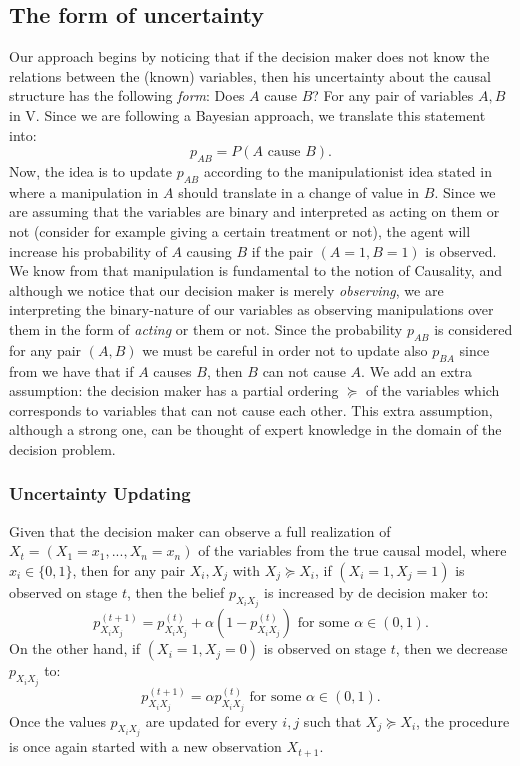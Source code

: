 \documentclass[letterpaper]{article}
\begin{document}
\subsection{The form of uncertainty}
Our approach begins by noticing that if the decision maker does not know the relations between the (known) variables, then his uncertainty about the causal structure has the following \textit{form}: Does $A$ cause $B$? For any pair of variables $A,B$ in V. Since we are following a Bayesian approach, we translate this statement into:
\[p_{AB}=P(A \textrm{ cause } B). \]
Now, the idea is to update $p_{AB}$ according to the manipulationist idea stated in \cite{woodward2005making} where a manipulation in $A$ should translate in a change of value in $B$. Since we are assuming that the variables are binary and interpreted as acting on them or not (consider for example giving a certain treatment or not), the agent will increase his probability of $A$ causing $B$ if the pair $(A=1,B=1)$ is observed. We know from \cite{holland1985statistics} that manipulation is fundamental to the notion of Causality, and although we notice that our decision maker is merely \textit{observing}, we are interpreting the binary-nature of our variables as observing manipulations over them in the form of \textit{acting} or them or not. Since the probability $p_{AB}$ is considered for any pair $(A,B)$ we must be careful in order not to update also $p_{BA}$ since from \cite{spirtes2000causation} we have that if $A$ causes $B$, then $B$ can not cause $A$. We add an extra assumption: the decision maker has a partial ordering $\succeq$ of the variables which corresponds to variables that can not cause each other. This extra assumption, although a strong one, can be thought of expert knowledge in the domain of the decision problem. 

\subsubsection{Uncertainty Updating}
Given that the decision maker can observe a full realization of $X_t=(X_1=x_1,...,X_n=x_n)$ of the variables from the true causal model, where $x_i \in \{0,1 \}$, then for any pair $X_i,X_j$ with $X_j \succeq X_i$, if $(X_i=1, X_j=1)$ is observed on stage $t$, then the belief $p_{X_i X_j}$ is increased by de decision maker to:
\[  p_{X_i X_j}^{(t+1)} = p_{X_i X_j}^{(t)}+\alpha (1-p_{X_i X_j}^{(t)}) \textrm{ for some } \alpha \in (0,1).  \]
On the other hand, if $(X_i=1, X_j=0)$ is observed on stage $t$, then we decrease $p_{X_i X_j}$ to:
\[ p_{X_i X_j}^{(t+1)} =   \alpha p_{X_i X_j}^{(t)}  \textrm{ for some } \alpha \in (0,1). \]
Once the values  $p_{X_i X_j}$ are updated for every $i,j$ such that $X_j \succeq X_i$, the procedure is once again started with a new observation $X_{t+1}$.
\end{document}
